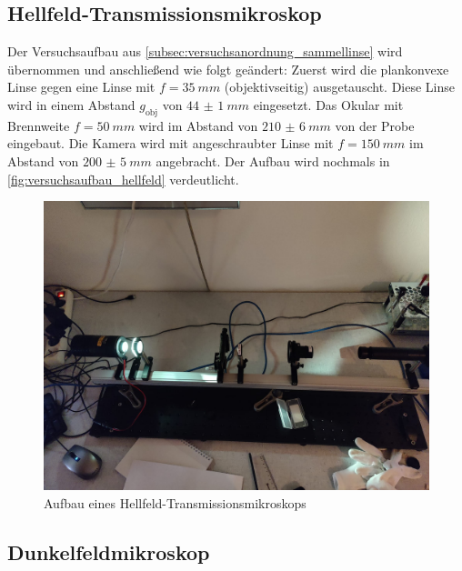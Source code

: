 \documentclass[ngerman]{scrartcl}
\begin{document}
\subsection{Hellfeld-Transmissionsmikroskop}
\label{subsec:versuchsanordnung_hellfeld}

Der Versuchsaufbau aus \autoref{subsec:versuchsanordnung_sammellinse} wird übernommen und anschließend wie folgt geändert: Zuerst wird die plankonvexe Linse gegen eine Linse mit $f = \SI{35}{mm}$ (objektivseitig) ausgetauscht. Diese Linse wird in einem Abstand $g_{\text{obj}}$ von $\SI{44(1)}{mm}$ eingesetzt. Das Okular mit Brennweite $f = \SI{50}{mm}$ wird im Abstand von $\SI{210(6)}{mm}$ von der Probe eingebaut. Die Kamera wird mit angeschraubter Linse mit $f = \SI{150}{mm}$ im Abstand von $\SI{200(5)}{mm}$ angebracht. %
Der Aufbau wird nochmals in \autoref{fig:versuchsaufbau_hellfeld} verdeutlicht.
%
\begin{figure}[H]
    \centering
    \begin{samepage}
        \includegraphics[width=\linewidth]{fig/Hellfeld_.jpeg}
        \caption{Aufbau eines Hellfeld-Transmissionsmikroskops}
        \label{fig:versuchsaufbau_hellfeld}
    \end{samepage}
\end{figure}


\subsection{Dunkelfeldmikroskop}
\label{subsec:versuchsanordnung_dunkelfeld}
\end{document}
